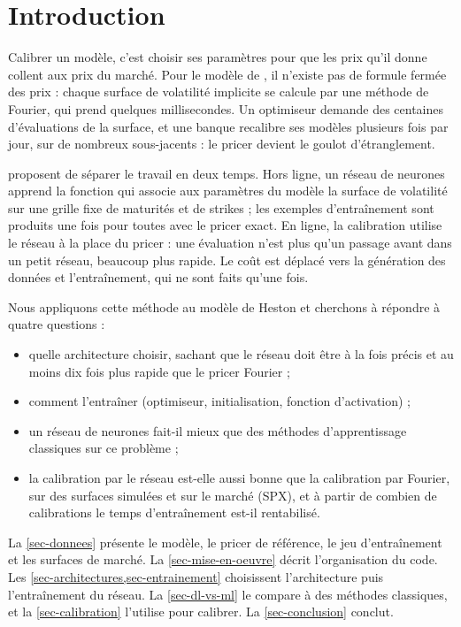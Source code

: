 \section{Introduction}
\label{sec-introduction}

Calibrer un modèle, c'est choisir ses paramètres pour que les prix qu'il donne collent aux prix du marché. Pour le
modèle de \citet{heston1993}, il n'existe pas de formule fermée des prix : chaque surface de volatilité implicite
se calcule par une méthode de Fourier, qui prend quelques millisecondes. Un optimiseur demande des centaines
d'évaluations de la surface, et une banque recalibre ses modèles plusieurs fois par jour, sur de nombreux sous-jacents :
le pricer devient le goulot d'étranglement.

\citet{horvath2021} proposent de séparer le travail en deux temps. Hors ligne, un réseau de neurones apprend la
fonction qui associe aux paramètres du modèle la surface de volatilité sur une grille fixe de maturités et de
strikes ; les exemples d'entraînement sont produits une fois pour toutes avec le pricer exact. En ligne, la
calibration utilise le réseau à la place du pricer : une évaluation n'est plus qu'un passage avant dans un petit
réseau, beaucoup plus rapide. Le coût est déplacé vers la génération des données et l'entraînement, qui ne sont
faits qu'une fois.

Nous appliquons cette méthode au modèle de Heston et cherchons à répondre à quatre questions :
\begin{itemize}
  \item quelle architecture choisir, sachant que le réseau doit être à la fois précis et au moins dix fois plus
  rapide que le pricer Fourier ;
  \item comment l'entraîner (optimiseur, initialisation, fonction d'activation) ;
  \item un réseau de neurones fait-il mieux que des méthodes d'apprentissage classiques sur ce problème ;
  \item la calibration par le réseau est-elle aussi bonne que la calibration par Fourier, sur des surfaces
  simulées et sur le marché (SPX), et à partir de combien de calibrations le temps d'entraînement est-il
  rentabilisé.
\end{itemize}

La \cref{sec-donnees} présente le modèle, le pricer de référence, le jeu d'entraînement et les surfaces de marché.
La \cref{sec-mise-en-oeuvre} décrit l'organisation du code. Les \cref{sec-architectures,sec-entrainement}
choisissent l'architecture puis l'entraînement du réseau. La \cref{sec-dl-vs-ml} le compare à des méthodes
classiques, et la \cref{sec-calibration} l'utilise pour calibrer. La \cref{sec-conclusion} conclut.
